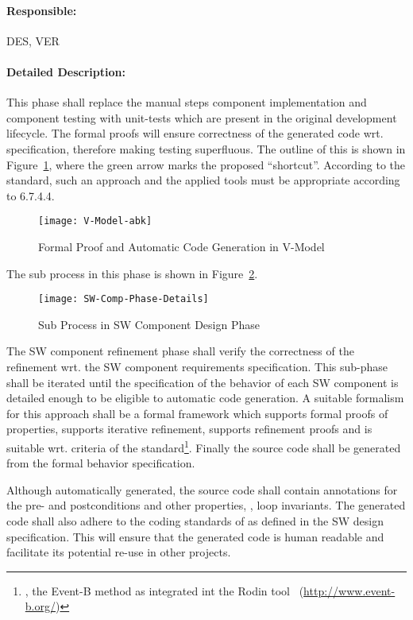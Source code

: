 \paragraph{Responsible:}
\label{sec:sw-comp-responsible}
DES, VER

\paragraph{Detailed Description:}
\label{sec:sw-comp-deta-descr}
This phase shall replace the manual steps component implementation and component
testing with unit-tests which are present in the original development
lifecycle. The formal proofs will ensure correctness of the generated code
wrt. specification, therefore making testing superfluous. The outline of this is
shown in Figure~\ref{fig:proof-code-generation}, where the green arrow marks the
proposed ``shortcut''. According to the standard, such an approach and the
applied tools must be appropriate according to 6.7.4.4.

\begin{figure}[ht]
  \centering
  \texttt{[image: V-Model-abk]}
  \caption{Formal Proof and Automatic Code Generation in V-Model}
  \label{fig:proof-code-generation}
\end{figure}

The sub process in this phase is shown in
Figure~\ref{fig:detailed-sw-comp-phase}.

\begin{figure}[ht]
  \centering
  \texttt{[image: SW-Comp-Phase-Details]}
  \caption{Sub Process in SW Component Design Phase}
  \label{fig:detailed-sw-comp-phase}
\end{figure}

The SW component refinement phase shall verify the correctness of the refinement
wrt. the SW component requirements specification. This sub-phase shall be
iterated until the specification of the behavior of each SW component is
detailed enough to be eligible to automatic code generation. A suitable
formalism for this approach shall be a formal framework which supports formal
proofs of properties, supports iterative refinement, supports refinement proofs
and is suitable wrt. criteria of the standard\footnote{\eg, the Event-B method
  as integrated int the Rodin tool~\cite{Abrial:Rodin}
  (\url{http://www.event-b.org/})}. Finally the source code shall be generated
from the formal behavior specification.

Although automatically generated, the source code shall contain annotations for
the pre- and postconditions and other properties, \eg, loop invariants. The
generated code shall also adhere to the coding standards of as defined in the SW
design specification. This will ensure that the generated code is human readable
and facilitate its potential re-use in other projects.


